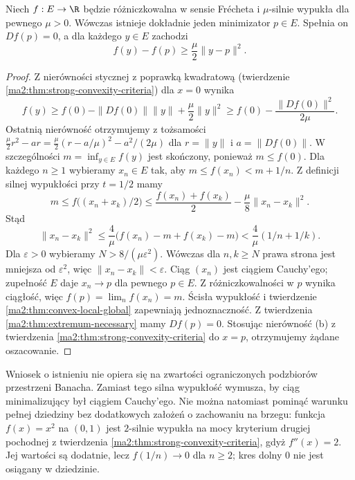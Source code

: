 \begin{twierdzenie}
\label{ma2:thm:strong-convex-minimum}
Niech $f:E\to\R$ będzie różniczkowalna w sensie Frécheta
i $\mu$-silnie wypukła dla pewnego $\mu>0$.
Wówczas istnieje dokładnie jeden minimizator $p\in E$.
Spełnia on $Df(p)=0$, a dla każdego $y\in E$ zachodzi
\[
 f(y)-f(p)\ge\frac{\mu}{2}\|y-p\|^2.
\]
\end{twierdzenie}
\begin{proof}
Z nierówności stycznej z poprawką kwadratową
(twierdzenie \ref{ma2:thm:strong-convexity-criteria})
dla $x=0$ wynika
\[
 f(y)\ge f(0)-\|Df(0)\|\|y\|+\frac{\mu}{2}\|y\|^2
 \ge f(0)-\frac{\|Df(0)\|^2}{2\mu}.
\]
Ostatnią nierówność otrzymujemy z tożsamości
$\frac{\mu}{2}r^2-ar=\frac{\mu}{2}(r-a/\mu)^2-a^2/(2\mu)$
dla $r=\|y\|$ i $a=\|Df(0)\|$. W szczególności $m=\inf_{y\in E}f(y)$
jest skończony, ponieważ $m\le f(0)$.
Dla każdego $n\ge1$ wybieramy $x_n\in E$ tak,
aby $m\le f(x_n)<m+1/n$.
Z definicji silnej wypukłości przy $t=1/2$ mamy
\[
 m\le f\bigl((x_n+x_k)/2\bigr)
 \le\frac{f(x_n)+f(x_k)}2-\frac{\mu}{8}\|x_n-x_k\|^2.
\]
Stąd
\[
 \|x_n-x_k\|^2
 \le\frac4\mu\bigl(f(x_n)-m+f(x_k)-m\bigr)
 <\frac4\mu(1/n+1/k).
\]
Dla $\varepsilon>0$ wybieramy $N>8/(\mu\varepsilon^2)$.
Wówczas dla $n,k\ge N$ prawa strona jest mniejsza
od $\varepsilon^2$, więc $\|x_n-x_k\|<\varepsilon$.
Ciąg $(x_n)$ jest ciągiem Cauchy'ego; zupełność $E$
daje $x_n\to p$ dla pewnego $p\in E$.
Z różniczkowalności w $p$ wynika ciągłość, więc
$f(p)=\lim_n f(x_n)=m$. Ścisła wypukłość i twierdzenie
\ref{ma2:thm:convex-local-global} zapewniają jednoznaczność.
Z twierdzenia \ref{ma2:thm:extremum-necessary} mamy
$Df(p)=0$. Stosując nierówność (b) z twierdzenia
\ref{ma2:thm:strong-convexity-criteria} do $x=p$,
otrzymujemy żądane oszacowanie.
\end{proof}

Wniosek o istnieniu nie opiera się na zwartości
ograniczonych podzbiorów przestrzeni Banacha.
Zamiast tego silna wypukłość wymusza, by ciąg
minimalizujący był ciągiem Cauchy'ego.
Nie można natomiast pominąć warunku pełnej dziedziny
bez dodatkowych założeń o zachowaniu na brzegu:
funkcja $f(x)=x^2$ na $(0,1)$ jest $2$-silnie wypukła
na mocy kryterium drugiej pochodnej z twierdzenia
\ref{ma2:thm:strong-convexity-criteria}, gdyż
$f''(x)=2$. Jej wartości są dodatnie, lecz
$f(1/n)\to0$ dla $n\ge2$; kres dolny $0$ nie jest
osiągany w dziedzinie.

